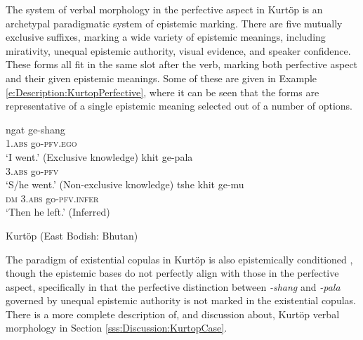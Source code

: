 The system of verbal morphology in the perfective aspect in Kurtöp \cite[East Bodish: Bhutan,][]{Hyslop2018} is an archetypal paradigmatic system of epistemic marking. There are five mutually exclusive suffixes, marking a wide variety of epistemic meanings, including mirativity, unequal epistemic authority, visual evidence, and speaker confidence. These forms all fit in the same slot after the verb, marking both perfective aspect and their given epistemic meanings. Some of these are given in Example \ref{e:Description:KurtopPerfective}, where it can be seen that the forms are representative of a single epistemic meaning selected out of a number of options.

\begin{exe}
        \ex\label{e:Description:KurtopPerfective}
        \begin{xlist}
                \ex 
                \gll ngat ge-shang \\
                1.\textsc{abs} go-\textsc{pfv.ego} \\
                \glt `I went.' (Exclusive knowledge) \cite[130]{Hyslop2018}
                \ex 
                \gll khit ge-pala \\
                3.\textsc{abs} go-\textsc{pfv} \\
                \glt `S/he went.' (Non-exclusive knowledge) \cite[130]{Hyslop2018}
                \ex 
                \gll tshe khit ge-mu \\
                \textsc{dm} 3.\textsc{abs} go-\textsc{pfv.infer} \\
                \glt `Then he left.' (Inferred) \cite[115]{Hyslop2014}
        \end{xlist}
        Kurtöp (East Bodish: Bhutan)
\end{exe}

The paradigm of existential copulas in Kurtöp is also epistemically conditioned \cite{Hyslop2014}, though the epistemic bases do not perfectly align with those in the perfective aspect, specifically in that the perfective distinction between \textit{-shang} and \textit{-pala} governed by unequal epistemic authority is not marked in the existential copulas. There is a more complete description of, and discussion about, Kurtöp verbal morphology in Section \ref{sss:Discussion:KurtopCase}.

